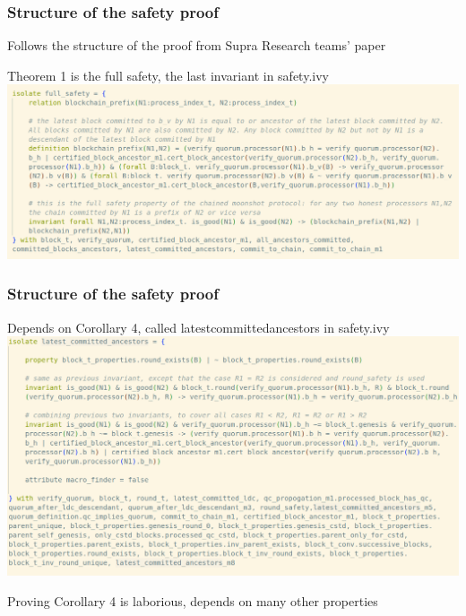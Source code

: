 \documentclass{beamer}
\begin{document}
\begin{frame}
    \frametitle{Structure of the safety proof}
    Follows the structure of the proof from Supra Research teams'
    paper

    Theorem 1 is the full safety, the last invariant in safety.ivy
    \includegraphics[scale=0.25]{FullSafety.png}
\end{frame}

\begin{frame}
    \frametitle{Structure of the safety proof}

    Depends on Corollary 4, called
    latest\textunderscore{}committed\textunderscore{}ancestors in
    safety.ivy
    \includegraphics[scale=0.25]{Corollary4.png}

    Proving Corollary 4 is laborious, depends on many other properties
\end{frame}
\end{document}
